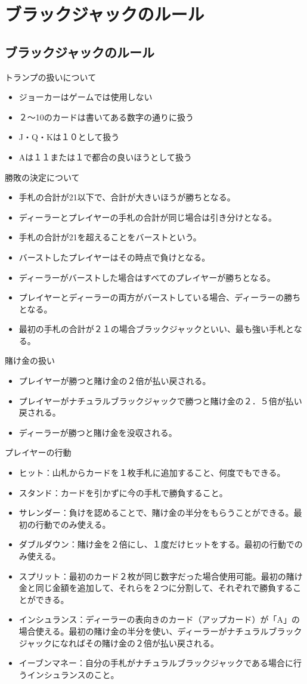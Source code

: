 \section{ブラックジャックのルール}

\subsection{ブラックジャックのルール}
トランプの扱いについて
\begin{itemize}
\item ジョーカーはゲームでは使用しない
\item ２～10のカードは書いてある数字の通りに扱う
\item J・Q・Kは１０として扱う
\item Aは１１または１で都合の良いほうとして扱う
\end{itemize}
勝敗の決定について
\begin{itemize}
\item 手札の合計が21以下で、合計が大きいほうが勝ちとなる。
\item ディーラーとプレイヤーの手札の合計が同じ場合は引き分けとなる。
\item 手札の合計が21を超えることをバーストという。
\item バーストしたプレイヤーはその時点で負けとなる。
\item ディーラーがバーストした場合はすべてのプレイヤーが勝ちとなる。
\item プレイヤーとディーラーの両方がバーストしている場合、ディーラーの勝ちとなる。
\item 最初の手札の合計が２１の場合ブラックジャックといい、最も強い手札となる。
\end{itemize}
賭け金の扱い
\begin{itemize}
\item プレイヤーが勝つと賭け金の２倍が払い戻される。
\item プレイヤーがナチュラルブラックジャックで勝つと賭け金の２．５倍が払い戻される。
\item ディーラーが勝つと賭け金を没収される。
\end{itemize}
プレイヤーの行動
\begin{itemize}
\item ヒット：山札からカードを１枚手札に追加すること、何度でもできる。
\item スタンド：カードを引かずに今の手札で勝負すること。
\item サレンダー：負けを認めることで、賭け金の半分をもらうことができる。最初の行動でのみ使える。
\item ダブルダウン：賭け金を２倍にし、１度だけヒットをする。最初の行動でのみ使える。
\item スプリット：最初のカード２枚が同じ数字だった場合使用可能。最初の賭け金と同じ金額を追加して、それらを２つに分割して、それぞれで勝負することができる。
\item インシュランス：ディーラーの表向きのカード（アップカード）が「A」の場合使える。最初の賭け金の半分を使い、ディーラーがナチュラルブラックジャックになればその賭け金の２倍が払い戻される。
\item イーブンマネー：自分の手札がナチュラルブラックジャックである場合に行うインシュランスのこと。
\end{itemize}
